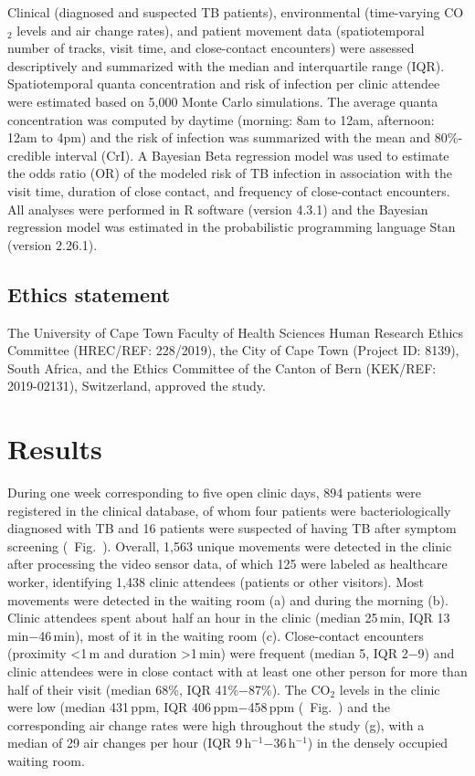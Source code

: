 \documentclass[fleqn,11pt]{wlscirep}
\begin{document}
Clinical (diagnosed and suspected TB patients), environmental (time-varying CO$_2$ levels and air change rates), and patient movement data (spatiotemporal number of tracks, visit time, and close-contact encounters) were assessed descriptively and summarized with the median and interquartile range (IQR). Spatiotemporal quanta concentration and risk of infection per clinic attendee were estimated based on 5,000 Monte Carlo simulations. The average quanta concentration was computed by daytime (morning: 8am to 12am, afternoon: 12am to 4pm) and the risk of infection was summarized with the mean and 80\%-credible interval (CrI). A Bayesian Beta regression model was used to estimate the odds ratio (OR) of the modeled risk of TB infection in association with the visit time, duration of close contact, and frequency of close-contact encounters. All analyses were performed in R software (version 4.3.1) and the Bayesian regression model was estimated in the probabilistic programming language Stan (version 2.26.1).

\subsection{Ethics statement}

The University of Cape Town Faculty of Health Sciences Human Research Ethics Committee (HREC/REF: 228/2019), the City of Cape Town (Project ID: 8139), South Africa, and the Ethics Committee of the Canton of Bern (KEK/REF: 2019-02131), Switzerland, approved the study.

\newpage

\section{Results}

During one week corresponding to five open clinic days, 894 patients were registered in the clinical database, of whom four patients were bacteriologically diagnosed with TB and 16 patients were suspected of having TB after symptom screening (\supp~Fig.~). Overall, 1,563 unique movements were detected in the clinic after processing the video sensor data, of which 125 were labeled as healthcare worker, identifying 1,438 clinic attendees (patients or other visitors). Most movements were detected in the waiting room (a) and during the morning (b). Clinic attendees spent about half an hour in the clinic (median 25\,min, IQR 13\,min$-$46\,min), most of it in the waiting room (c). Close-contact encounters (proximity <1\,m and duration >1\,min) were frequent (median 5, IQR 2$-$9) and clinic attendees were in close contact with at least one other person for more than half of their visit (median 68\%, IQR 41\%$-$87\%). The CO$_2$ levels in the clinic were low (median 431\,ppm, IQR 406\,ppm$-$458\,ppm (\supp~Fig.~) and the corresponding air change rates were high throughout the study (g), with a \eg median of 29 air changes per hour (IQR 9\,h$^{-1}$$-$36\,h$^{-1}$) in the densely occupied waiting room. 
\end{document}
